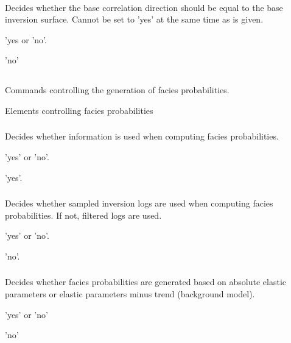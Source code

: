 \paragraph{}
 \slist
   \item \Description Decides whether the base correlation direction should be equal to the base inversion surface. Cannot be set to 'yes' at the same time as  is given.
   \item \Argument 'yes or 'no'.
   \item \Default 'no'
 \elist

\subsection{}
 \slist
   \item \Description Commands controlling the generation of facies probabilities.
   \item \Argument Elements controlling facies probabilities
   \item \Default
 \elist

\subsubsection{}
\slist
  \item \Description Decides whether \vs information is used when computing facies probabilities.
  \item \Argument 'yes' or 'no'.
  \item \Default 'yes'.
\elist

\subsubsection{}
\slist
  \item \Description Decides whether sampled inversion logs are used when computing facies probabilities. If not, filtered logs are used.
  \item \Argument 'yes' or 'no'.
  \item \Default 'no'.
\elist

\subsubsection{}  
 \slist
   \item \Description Decides whether facies probabilities are
     generated based on absolute elastic parameters or elastic
     parameters minus trend (background model).
   \item \Argument 'yes' or 'no'
   \item \Default 'no'
 \elist


